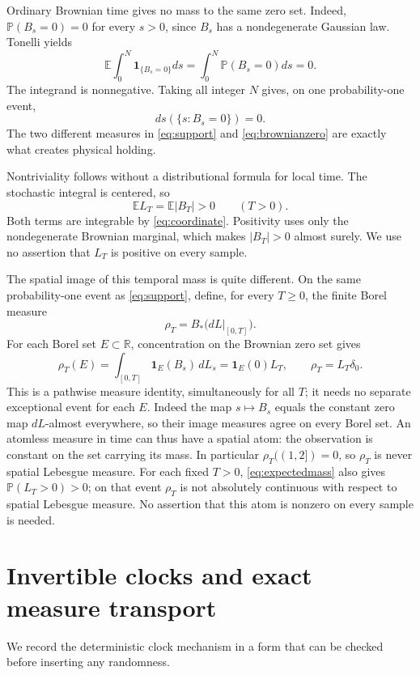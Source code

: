 \documentclass[11pt]{article}
\newcommand{\E}{\mathbb E}
\newcommand{\Pp}{\mathbb P}
\newcommand{\R}{\mathbb R}
\newcommand{\ind}{\mathbf1}
\begin{document}
Ordinary Brownian time gives no mass to the same zero set. Indeed,
$\Pp(B_s=0)=0$ for every $s>0$, since $B_s$ has a nondegenerate
Gaussian law. Tonelli yields
\[
 \E\int_0^N\ind_{\{B_s=0\}}ds
 =\int_0^N\Pp(B_s=0)ds=0.
\]
The integrand is nonnegative. Taking all integer $N$ gives,
on one probability-one event,
\begin{equation}\label{eq:brownianzero}
 ds(\{s:B_s=0\})=0.
\end{equation}
The two different measures in \eqref{eq:support} and
\eqref{eq:brownianzero} are exactly what creates physical holding.

Nontriviality follows without a distributional formula for local
time. The stochastic integral is centered, so
\begin{equation}\label{eq:expectedmass}
 \E L_T=\E|B_T|>0\qquad(T>0).
\end{equation}
Both terms are integrable by \eqref{eq:coordinate}. Positivity uses
only the nondegenerate Brownian marginal, which makes $|B_T|>0$
almost surely. We use no assertion that $L_T$ is positive on every
sample.


The spatial image of this temporal mass is quite different. On the
same probability-one event as \eqref{eq:support}, define, for every
$T\geq0$, the finite Borel measure
\[
 \rho_T=B_*\bigl(dL|_{[0,T]}\bigr).
\]
For each Borel set $E\subset\R$, concentration on the Brownian zero
set gives
\begin{equation}\label{eq:masscollapse}
 \rho_T(E)=\int_{[0,T]}\ind_E(B_s)\,dL_s
 =\ind_E(0)L_T,\qquad \rho_T=L_T\delta_0.
\end{equation}
This is a pathwise measure identity, simultaneously for all $T$;
it needs no separate exceptional event for each $E$. Indeed the
map $s\mapsto B_s$ equals the constant zero map $dL$-almost
everywhere, so their image measures agree on every Borel set.
An atomless measure in time can thus have a spatial atom: the
observation is constant on the set carrying its mass. In particular
$\rho_T((1,2])=0$, so $\rho_T$ is never spatial Lebesgue measure.
For each fixed $T>0$, \eqref{eq:expectedmass} also gives
$\Pp(L_T>0)>0$; on that event $\rho_T$ is not absolutely continuous
with respect to spatial Lebesgue measure. No assertion that this
atom is nonzero on every sample is needed.

\section{Invertible clocks and exact measure transport}
We record the deterministic clock mechanism in a form that can be
checked before inserting any randomness.
\end{document}
